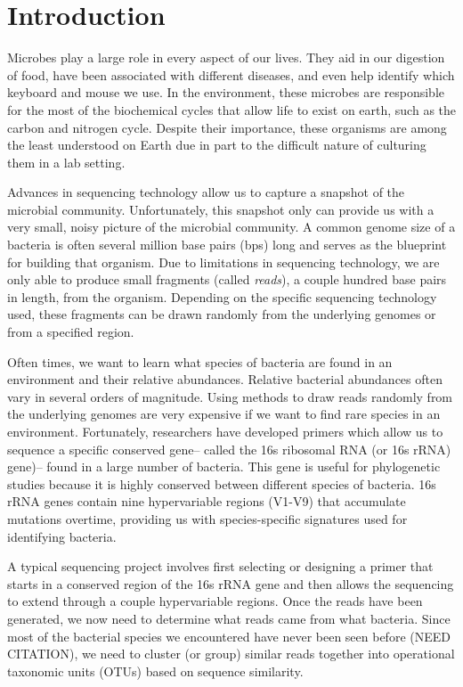 \section{Introduction}

Microbes play a large role in every aspect of our lives.
They aid in our digestion of food\cite{gill_metagenomic_2006}, have been associated with different diseases\cite{qin_metagenome-wide_2012}, and even help identify which keyboard and mouse we use\cite{fierer_forensic_2010}.
In the environment, these microbes are responsible for the most of the biochemical cycles that allow life to exist on earth, such as the carbon and nitrogen cycle\cite{venter_environmental_2004}.
Despite their importance, these organisms are among the least understood on Earth due in part to the difficult nature of culturing them in a lab setting.

Advances in sequencing technology allow us to capture a snapshot of the microbial community.
Unfortunately, this snapshot only can provide us with a very small, noisy picture of the microbial community.
A common genome size of a bacteria is often several million base pairs (bps) long and serves as the blueprint for building that organism.
Due to limitations in sequencing technology, we are only able to produce small fragments (called \emph{reads}), a couple hundred base pairs in length, from the organism.
Depending on the specific sequencing technology used, these fragments can be drawn randomly from the underlying genomes or from a specified region.

Often times, we want to learn what species of bacteria are found in an environment and their relative abundances.
Relative bacterial abundances often vary in several orders of magnitude.
Using methods to draw reads randomly from the underlying genomes are very expensive if we want to find rare species in an environment.
Fortunately, researchers have developed primers which allow us to sequence a specific conserved gene-- called the 16s ribosomal RNA (or 16s rRNA) gene)-- found in a large number of bacteria.
This gene is useful for phylogenetic studies because it is highly conserved between different species of bacteria.
16s rRNA genes contain nine hypervariable regions (V1-V9) that accumulate mutations overtime, providing us with species-specific signatures used for identifying bacteria.

A typical sequencing project involves first selecting or designing a primer that starts in a conserved region of the 16s rRNA gene and then allows the sequencing to extend through a couple hypervariable regions.
Once the reads have been generated, we now need to determine what reads came from what bacteria.
Since most of the bacterial species we encountered have never been seen before (NEED CITATION), we need to cluster (or group) similar reads together into operational taxonomic units (OTUs) based on sequence similarity.


